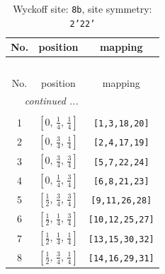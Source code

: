 \documentclass[fleqn,8pt]{jsarticle}
\begin{document}
\begin{longtable}{ccc}
\caption{Wyckoff site: {\tt 8b}, site symmetry: {\tt 2'22'}}
 \\
 \hline \hline
No. & position & mapping \\ \hline \endfirsthead

\multicolumn{2}{l}{\tablename\ \thetable{}} \\
 \hline \hline
No. & position & mapping \\ \hline \endhead

 \hline \hline
\multicolumn{2}{r}{\footnotesize\it continued ...} \\ \endfoot

 \hline \hline
\multicolumn{2}{r}{} \\ \endlastfoot

1 & $\left[ 0,\, \frac{1}{4},\, \frac{1}{4} \right]$ & {\tt [1,3,18,20]} \\ \hline
2 & $\left[ 0,\, \frac{3}{4},\, \frac{1}{4} \right]$ & {\tt [2,4,17,19]} \\ \hline
3 & $\left[ 0,\, \frac{3}{4},\, \frac{3}{4} \right]$ & {\tt [5,7,22,24]} \\ \hline
4 & $\left[ 0,\, \frac{1}{4},\, \frac{3}{4} \right]$ & {\tt [6,8,21,23]} \\ \hline
5 & $\left[ \frac{1}{2},\, \frac{3}{4},\, \frac{3}{4} \right]$ & {\tt [9,11,26,28]} \\ \hline
6 & $\left[ \frac{1}{2},\, \frac{1}{4},\, \frac{3}{4} \right]$ & {\tt [10,12,25,27]} \\ \hline
7 & $\left[ \frac{1}{2},\, \frac{1}{4},\, \frac{1}{4} \right]$ & {\tt [13,15,30,32]} \\ \hline
8 & $\left[ \frac{1}{2},\, \frac{3}{4},\, \frac{1}{4} \right]$ & {\tt [14,16,29,31]} \\
\end{longtable}
\renewcommand{\arraystretch}{1.2}
\end{document}
